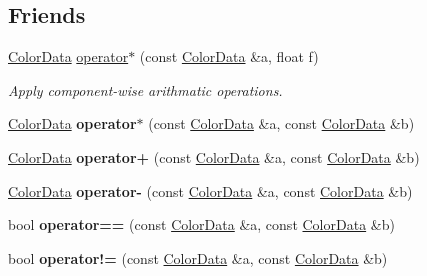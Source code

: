 \subsection*{Friends}
\begin{DoxyCompactItemize}
\item 
\hyperlink{classColorData}{Color\+Data} \hyperlink{classColorData_adf9a770243996e50282d248a4327f351}{operator$\ast$} (const \hyperlink{classColorData}{Color\+Data} \&a, float f)\hypertarget{classColorData_adf9a770243996e50282d248a4327f351}{}\label{classColorData_adf9a770243996e50282d248a4327f351}

\begin{DoxyCompactList}\small\item\em Apply component-\/wise arithmatic operations. \end{DoxyCompactList}\item 
\hyperlink{classColorData}{Color\+Data} {\bfseries operator$\ast$} (const \hyperlink{classColorData}{Color\+Data} \&a, const \hyperlink{classColorData}{Color\+Data} \&b)\hypertarget{classColorData_afdc3e8e6338798779739352e6bdfa42b}{}\label{classColorData_afdc3e8e6338798779739352e6bdfa42b}

\item 
\hyperlink{classColorData}{Color\+Data} {\bfseries operator+} (const \hyperlink{classColorData}{Color\+Data} \&a, const \hyperlink{classColorData}{Color\+Data} \&b)\hypertarget{classColorData_afee00faf26189979b72f3854a17200ae}{}\label{classColorData_afee00faf26189979b72f3854a17200ae}

\item 
\hyperlink{classColorData}{Color\+Data} {\bfseries operator-\/} (const \hyperlink{classColorData}{Color\+Data} \&a, const \hyperlink{classColorData}{Color\+Data} \&b)\hypertarget{classColorData_a799bd54f65a61569b5b968062ac0d37e}{}\label{classColorData_a799bd54f65a61569b5b968062ac0d37e}

\item 
bool {\bfseries operator==} (const \hyperlink{classColorData}{Color\+Data} \&a, const \hyperlink{classColorData}{Color\+Data} \&b)\hypertarget{classColorData_a9dae9e77610393d100312c9d248f09cc}{}\label{classColorData_a9dae9e77610393d100312c9d248f09cc}

\item 
bool {\bfseries operator!=} (const \hyperlink{classColorData}{Color\+Data} \&a, const \hyperlink{classColorData}{Color\+Data} \&b)\hypertarget{classColorData_a698ac263a286afe37e3b9ed0c5882c8c}{}\label{classColorData_a698ac263a286afe37e3b9ed0c5882c8c}

\end{DoxyCompactItemize}


